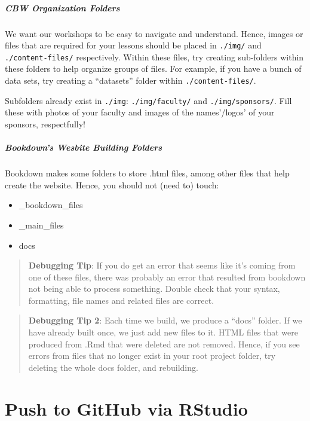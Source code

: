 \documentclass[
]{book}
\providecommand{\tightlist}{%
  \setlength{\itemsep}{0pt}\setlength{\parskip}{0pt}}
\theoremstyle{definition}
\theoremstyle{definition}
\theoremstyle{definition}
\theoremstyle{definition}
\theoremstyle{remark}
\begin{document}
\subparagraph*{CBW Organization Folders}\label{cbw-organization-folders}

We want our workshops to be easy to navigate and understand. Hence, images or files that are required for your lessons should be placed in \texttt{./img/} and \texttt{./content-files/} respectively. Within these files, try creating sub-folders within these folders to help organize groups of files. For example, if you have a bunch of data sets, try creating a ``datasets'' folder within \texttt{./content-files/}.

Subfolders already exist in \texttt{./img}: \texttt{./img/faculty/} and \texttt{./img/sponsors/}. Fill these with photos of your faculty and images of the names'/logos' of your sponsors, respectfully!

\subparagraph*{Bookdown's Wesbite Building Folders}\label{bookdowns-wesbite-building-folders}

Bookdown makes some folders to store .html files, among other files that help create the website. Hence, you should not (need to) touch:

\begin{itemize}
\tightlist
\item
  \_bookdown\_files
\item
  \_main\_files
\item
  docs
\end{itemize}

\begin{quote}
\textbf{Debugging Tip}: If you do get an error that seems like it's coming from one of these files, there was probably an error that resulted from bookdown not being able to process something. Double check that your syntax, formatting, file names and related files are correct.
\end{quote}

\begin{quote}
\textbf{Debugging Tip 2}: Each time we build, we produce a ``docs'' folder. If we have already built once, we just add new files to it. HTML files that were produced from .Rmd that were deleted are not removed. Hence, if you see errors from files that no longer exist in your root project folder, try deleting the whole docs folder, and rebuilding.
\end{quote}

\section{Push to GitHub via RStudio}\label{push-to-github-via-rstudio}
\end{document}
